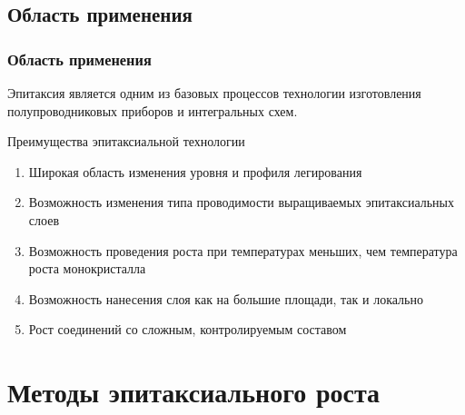 \documentclass[10pt,pdf,hyperref={unicode}, dvipsnames]{beamer}
\begin{document}
\begin{frame}[t]
\end{frame}


\subsection{Область применения}
\begin{frame}[t]
	\frametitle{Область применения}
	Эпитаксия является одним из базовых процессов технологии изготовления полупроводниковых приборов и интегральных
	схем.
	\vspace{20pt}

	Преимущества эпитаксиальной технологии
	\begin{enumerate}
		\item Широкая область изменения уровня и профиля легирования 
		\item Возможность изменения типа проводимости выращиваемых эпитаксиальных слоев
		\item Возможность проведения роста при температурах меньших, чем температура роста монокристалла
		\item Возможность нанесения слоя как на большие площади, так и локально
		\item Рост соединений со сложным, контролируемым составом
	\end{enumerate}

\end{frame}



\section{Методы эпитаксиального роста}
\end{document}
